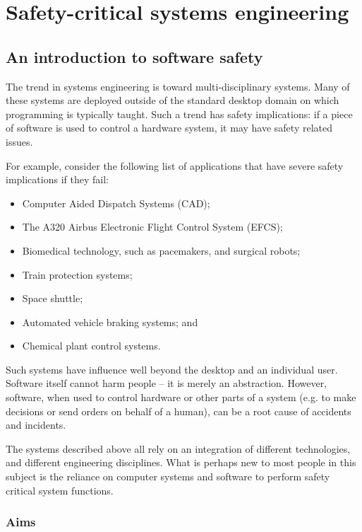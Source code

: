 \chapter{Safety-critical systems engineering}
\label{chapter:safety}

\section{An introduction to software safety}
  
The trend in systems engineering is toward multi-disciplinary systems. Many of these systems are deployed outside of the standard desktop domain on which programming is typically taught. Such a trend has safety implications: if a piece of software is used to control a hardware system, it may have safety related issues.

For example, consider the following list of applications that have severe safety implications if they fail:

  \begin{itemize}
  \item Computer Aided Dispatch Systems (CAD);
  \item The A320 Airbus Electronic Flight Control System (EFCS);
  \item Biomedical technology, such as pacemakers, and surgical
    robots;
  \item Train protection systems;
  \item Space shuttle;
  \item Automated vehicle braking systems; and
  \item Chemical plant control systems.
\end{itemize}

Such systems have influence well beyond the desktop and an individual user. Software itself cannot harm people -- it is merely an abstraction. However, software, when used to control hardware or other parts of a system (e.g. to make decisions or send orders on behalf of a human), can be a root cause of accidents and incidents.

The systems described above all rely on an integration of different  technologies, and different engineering disciplines.  What is perhaps new to most people in this subject is the reliance on computer systems and software to perform safety critical system functions.


\subsection*{Aims}

